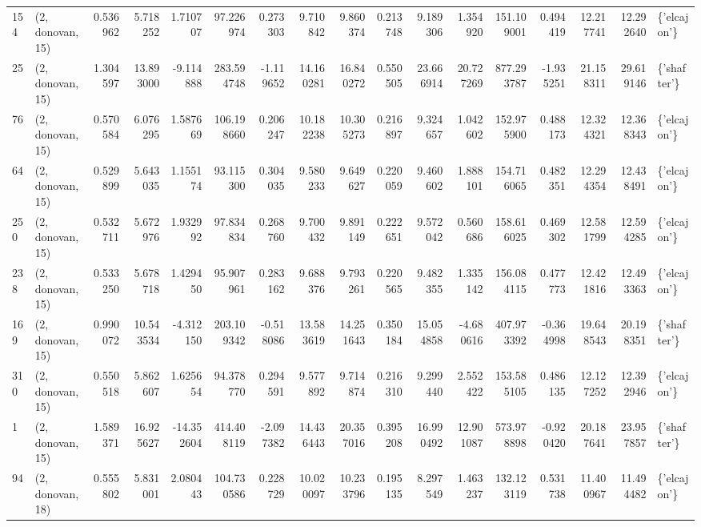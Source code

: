 \begin{tabular}{llrrrrrrrrrrrrrrl}
154 &  (2, donovan, 15) &   0.536962 &   5.718252 &   1.710707 &    97.226974 &   0.273303 &   9.710842 &   9.860374 &  0.213748 &   9.189306 &   1.354920 &   151.109001 &   0.494419 &  12.217741 &  12.292640 &  \{'elcajon'\} \\
25  &  (2, donovan, 15) &   1.304597 &  13.893000 &  -9.114888 &   283.594748 &  -1.119652 &  14.160281 &  16.840272 &  0.550505 &  23.666914 &  20.727269 &   877.293787 &  -1.935251 &  21.158311 &  29.619146 &  \{'shafter'\} \\
76  &  (2, donovan, 15) &   0.570584 &   6.076295 &   1.587669 &   106.198660 &   0.206247 &  10.182238 &  10.305273 &  0.216897 &   9.324657 &   1.042602 &   152.975900 &   0.488173 &  12.324321 &  12.368343 &  \{'elcajon'\} \\
64  &  (2, donovan, 15) &   0.529899 &   5.643035 &   1.155174 &    93.115300 &   0.304035 &   9.580233 &   9.649627 &  0.220059 &   9.460602 &   1.888101 &   154.716065 &   0.482351 &  12.294354 &  12.438491 &  \{'elcajon'\} \\
250 &  (2, donovan, 15) &   0.532711 &   5.672976 &   1.932992 &    97.834834 &   0.268760 &   9.700432 &   9.891149 &  0.222651 &   9.572042 &   0.560686 &   158.616025 &   0.469302 &  12.581799 &  12.594285 &  \{'elcajon'\} \\
238 &  (2, donovan, 15) &   0.533250 &   5.678718 &   1.429450 &    95.907961 &   0.283162 &   9.688376 &   9.793261 &  0.220565 &   9.482355 &   1.335142 &   156.084115 &   0.477773 &  12.421816 &  12.493363 &  \{'elcajon'\} \\
169 &  (2, donovan, 15) &   0.990072 &  10.543534 &  -4.312150 &   203.109342 &  -0.518086 &  13.583619 &  14.251643 &  0.350184 &  15.054858 &  -4.680616 &   407.973392 &  -0.364998 &  19.648543 &  20.198351 &  \{'shafter'\} \\
310 &  (2, donovan, 15) &   0.550518 &   5.862607 &   1.625654 &    94.378770 &   0.294591 &   9.577892 &   9.714874 &  0.216310 &   9.299440 &   2.552422 &   153.585105 &   0.486135 &  12.127252 &  12.392946 &  \{'elcajon'\} \\
1   &  (2, donovan, 15) &   1.589371 &  16.925627 & -14.352604 &   414.408119 &  -2.097382 &  14.436443 &  20.357016 &  0.395208 &  16.990492 &  12.901087 &   573.978898 &  -0.920420 &  20.187641 &  23.957857 &  \{'shafter'\} \\
94  &  (2, donovan, 18) &   0.555802 &   5.831001 &   2.080443 &   104.730586 &   0.228729 &  10.020097 &  10.233796 &  0.195135 &   8.297549 &   1.463237 &   132.123119 &   0.531738 &  11.400967 &  11.494482 &  \{'elcajon'\} \\

\end{tabular}
